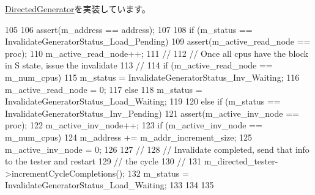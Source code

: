\hyperlink{classDirectedGenerator_a5aad2098d3cbda728f41beff10faea99}{DirectedGenerator}を実装しています。


\begin{DoxyCode}
105 {
106     assert(m_address == address);  
107 
108     if (m_status == InvalidateGeneratorStatus_Load_Pending) {
109         assert(m_active_read_node == proc);
110         m_active_read_node++;
111         //
112         // Once all cpus have the block in S state, issue the invalidate
113         //
114         if (m_active_read_node == m_num_cpus) {
115             m_status = InvalidateGeneratorStatus_Inv_Waiting;
116             m_active_read_node = 0;
117         } else {
118             m_status = InvalidateGeneratorStatus_Load_Waiting;
119         }
120     } else if (m_status == InvalidateGeneratorStatus_Inv_Pending) {
121         assert(m_active_inv_node == proc);
122         m_active_inv_node++;
123         if (m_active_inv_node == m_num_cpus) {
124             m_address += m_addr_increment_size;
125             m_active_inv_node = 0;
126         }
127         //
128         // Invalidate completed, send that info to the tester and restart
129         // the cycle
130         //
131         m_directed_tester->incrementCycleCompletions();
132         m_status = InvalidateGeneratorStatus_Load_Waiting;
133     } 
134     
135 }
\end{DoxyCode}


